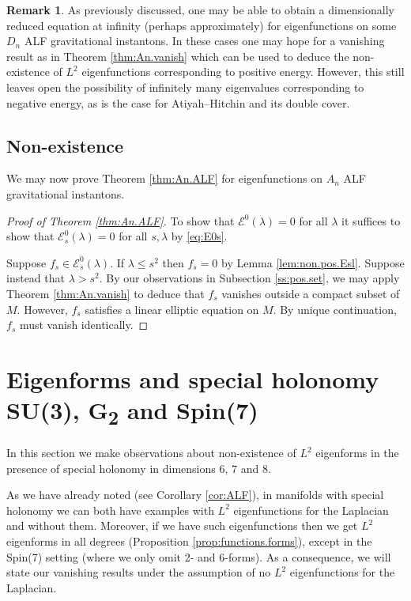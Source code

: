 \documentclass{article}
\theoremstyle{definition}
\newtheorem{rmk}[thm]{Remark}
\numberwithin{thm}{section}
\numberwithin{equation}{section}
\begin{document}
\begin{rmk}
    As previously discussed, one may be able to obtain a dimensionally reduced equation at infinity (perhaps approximately) for eigenfunctions on some $D_n$ ALF gravitational instantons.  In these cases one may hope for a vanishing result as in Theorem \ref{thm:An.vanish} which can be used to deduce the non-existence of $L^2$ eigenfunctions corresponding to positive energy.  However, this still leaves open the possibility of infinitely many eigenvalues corresponding to negative energy, as is the case for Atiyah--Hitchin and its double cover. 
\end{rmk}

\subsection{Non-existence}

We may now prove Theorem \ref{thm:An.ALF} for eigenfunctions on $A_{n}$ ALF gravitational instantons.

\begin{proof}[Proof of Theorem \ref{thm:An.ALF}] 
To show that $\mathcal{E}^0(\lambda)=0$ for all $\lambda$ it suffices to show that $\mathcal{E}^0_s(\lambda)=0$ for all $s,\lambda$ by \eqref{eq:E0s}.  

Suppose $f_s\in\mathcal{E}^0_s(\lambda)$.  If $\lambda\leq s^2$ then $f_s=0$ by Lemma \ref{lem:non.pos.Esl}.  Suppose instead that $\lambda>s^2$. By our observations in Subsection \ref{ss:pos.set}, we may apply Theorem \ref{thm:An.vanish} to deduce that $f_s$ vanishes outside a compact subset of $M$.  However, $f_s$ satisfies a linear elliptic equation on $M$.  
By unique continuation, $f_s$ must vanish identically.
\end{proof}
 
\section{Eigenforms and special holonomy SU(3), \texorpdfstring{G\textsubscript{2}}{G2} and Spin(7)}\label{sec:special.hol}

In this section we make observations about non-existence of $L^2$ eigenforms in the presence of special holonomy in dimensions $6$, $7$ and $8$.  

As we have already noted (see Corollary \ref{cor:ALF}), in manifolds with special holonomy we can both have examples with $L^2$ eigenfunctions for the Laplacian and without them.  Moreover, if we have such eigenfunctions then we get $L^2$ eigenforms in all degrees (Proposition \ref{prop:functions.forms}), except in the Spin(7) setting (where we only omit 2- and 6-forms).  
As a consequence, we will state our vanishing results under the assumption of no $L^2$ eigenfunctions for the Laplacian.  
\end{document}
